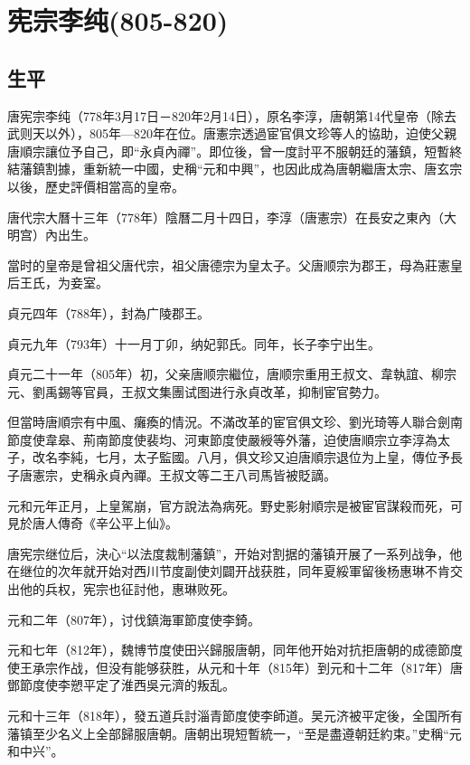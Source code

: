 
\section{宪宗李纯\tiny(805-820)}

\subsection{生平}

唐宪宗李纯（778年3月17日－820年2月14日），原名李淳，唐朝第14代皇帝（除去武则天以外），805年—820年在位。唐憲宗透過宦官俱文珍等人的協助，迫使父親唐順宗讓位予自己，即“永貞內禪”。即位後，曾一度討平不服朝廷的藩鎮，短暫終結藩鎮割據，重新統一中國，史稱“元和中興”，也因此成為唐朝繼唐太宗、唐玄宗以後，歷史評價相當高的皇帝。

唐代宗大曆十三年（778年）陰曆二月十四日，李淳（唐憲宗）在長安之東內（大明宫）內出生。

當时的皇帝是曾祖父唐代宗，祖父唐德宗为皇太子。父唐顺宗为郡王，母為莊憲皇后王氏，为妾室。

貞元四年（788年），封為广陵郡王。

貞元九年（793年）十一月丁卯，纳妃郭氏。同年，长子李宁出生。

貞元二十一年（805年）初，父亲唐顺宗繼位，唐顺宗重用王叔文、韋執誼、柳宗元、劉禹錫等官員，王叔文集團试图进行永貞改革，抑制宦官勢力。

但當時唐順宗有中風、癱瘓的情況。不滿改革的宦官俱文珍、劉光琦等人聯合劍南節度使韋皋、荊南節度使裴均、河東節度使嚴綬等外藩，迫使唐順宗立李淳為太子，改名李純，七月，太子監國。八月，俱文珍又迫唐順宗退位为上皇，傳位予長子唐憲宗，史稱永貞內禪。王叔文等二王八司馬皆被貶謫。

元和元年正月，上皇駕崩，官方說法為病死。野史影射順宗是被宦官謀殺而死，可見於唐人傳奇《辛公平上仙》。

唐宪宗继位后，決心“以法度裁制藩鎮”，开始对割据的藩镇开展了一系列战争，他在继位的次年就开始对西川节度副使刘闢开战获胜，同年夏綏軍留後杨惠琳不肯交出他的兵权，宪宗也征討他，惠琳败死。

元和二年（807年），讨伐鎮海軍節度使李錡。

元和七年（812年），魏博节度使田兴歸服唐朝，同年他开始对抗拒唐朝的成德節度使王承宗作战，但没有能够获胜，从元和十年（815年）到元和十二年（817年）唐鄧節度使李愬平定了淮西吳元濟的叛乱。

元和十三年（818年），發五道兵討淄青節度使李師道。吴元济被平定後，全国所有藩镇至少名义上全部歸服唐朝。唐朝出現短暫統一，“至是盡遵朝廷約束。”史稱“元和中兴”。


